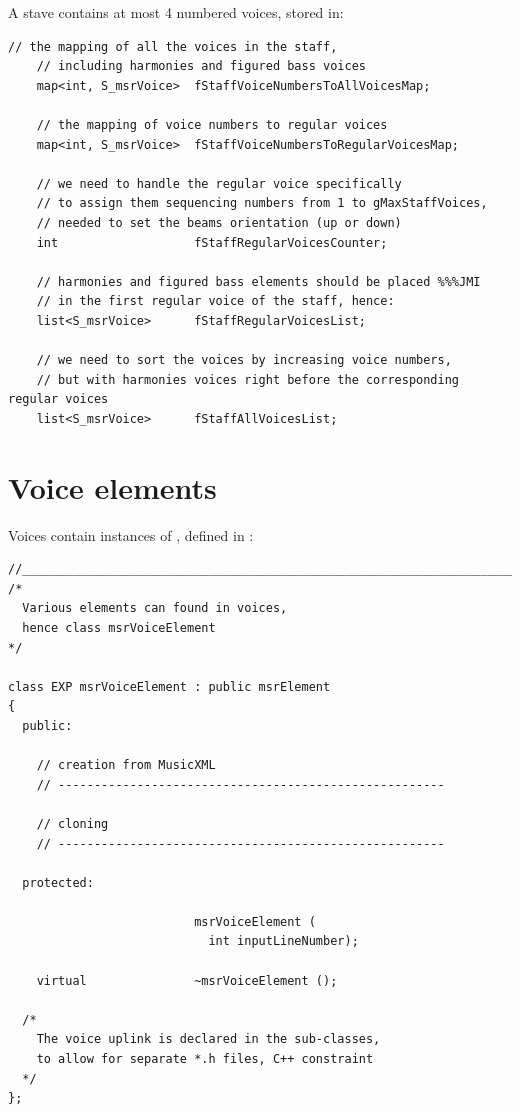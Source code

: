 A stave contains at most 4 numbered voices, stored in:
\begin{lstlisting}[language=CPlusPlus]
    // the mapping of all the voices in the staff,
    // including harmonies and figured bass voices
    map<int, S_msrVoice>  fStaffVoiceNumbersToAllVoicesMap;

    // the mapping of voice numbers to regular voices
    map<int, S_msrVoice>  fStaffVoiceNumbersToRegularVoicesMap;

    // we need to handle the regular voice specifically
    // to assign them sequencing numbers from 1 to gMaxStaffVoices,
    // needed to set the beams orientation (up or down)
    int                   fStaffRegularVoicesCounter;

    // harmonies and figured bass elements should be placed %%%JMI
    // in the first regular voice of the staff, hence:
    list<S_msrVoice>      fStaffRegularVoicesList;

    // we need to sort the voices by increasing voice numbers,
    // but with harmonies voices right before the corresponding regular voices
    list<S_msrVoice>      fStaffAllVoicesList;
\end{lstlisting}


\section{Voice elements}\label{Voice elements}

Voices contain instances of , defined in :
\begin{lstlisting}[language=CPlusPlus]
//______________________________________________________________________________
/*
  Various elements can found in voices,
  hence class msrVoiceElement
*/

class EXP msrVoiceElement : public msrElement
{
  public:

    // creation from MusicXML
    // ------------------------------------------------------

    // cloning
    // ------------------------------------------------------

  protected:

                          msrVoiceElement (
                            int inputLineNumber);

    virtual               ~msrVoiceElement ();

  /*
    The voice uplink is declared in the sub-classes,
    to allow for separate *.h files, C++ constraint
  */
};
\end{lstlisting}

